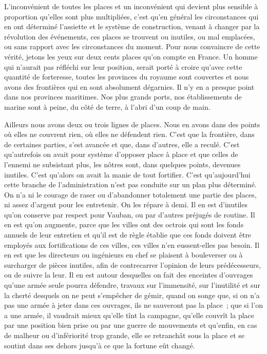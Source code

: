 \documentclass[french,twoside]{book} %
\begin{document}
L’inconvénient de toutes les places et un inconvénient qui devient plus sensible à proportion qu’elles sont plus multipliées, c’est qu’en général les circonstances qui en ont déterminé l’assiette et le système de construction, venant à changer par la révolution des événements, ces places se trouvent ou inutiles, ou mal emplacées, ou sans rapport avec les circonstances du moment. Pour nous convaincre de cette vérité, jetons les yeux sur deux cents places qu’on compte en France. Un homme qui n’aurait pas réfléchi sur leur position, serait porté à croire qu’avec cette quantité de forteresse, toutes les provinces du royaume sont couvertes et nous avons des frontières qui en sont absolument dégarnies. Il n’y en a presque point dans nos provinces maritimes. Nos plus grands ports, nos établissements de marine sont à peine, du côté de terre, à l’abri d’un coup de main.\par
Ailleurs nous avons deux ou trois lignes de places. Nous en avons dans des points où elles ne couvrent rien, où elles ne défendent rien. C’est que la frontière, dans de certaines parties, s’est avancée et que, dans d’autres, elle a reculé. C’est qu’autrefois on avait pour système d’opposer place à place et que celles de l’ennemi ne subsistant plus, les nôtres sont, dans quelques points, devenues inutiles. C’est qu’alors on avait la manie de tout fortifier. C’est qu’aujourd’hui cette branche de l’administration n’est pas conduite sur un plan plus déterminé. On n’a ni le courage de raser ou d’abandonner totalement une partie des places, ni assez d’argent pour les entretenir. On les répare à demi. Il en est d’inutiles qu’on conserve par respect pour Vauban, ou par d’autres préjugés de routine. Il en est qu’on augmente, parce que les villes ont des octrois qui sont les fonds annuels de leur entretien et qu’il est de règle établie que ces fonds doivent être employés aux fortifications de ces villes, ces villes n’en eussent-elles pas besoin. Il en est que les directeurs ou ingénieurs en chef se plaisent à bouleverser ou à surcharger de pièces inutiles, afin de contrecarrer l’opinion de leurs prédécesseurs, ou de suivre la leur. Il en est autour desquelles on fait des enceintes d’ouvrages qu’une armée seule pourra défendre, travaux sur l’immensité, sur l’inutilité et sur la cherté desquels on ne peut s’empêcher de gémir, quand on songe que, si on n’a pas une armée à jeter dans ces ouvrages, ils ne sauveront pas la place ; que si l’on a une armée, il vaudrait mieux qu’elle tînt la campagne, qu’elle couvrît la place par une position bien prise ou par une guerre de mouvements et qu’enfin, en cas de malheur ou d’infériorité trop grande, elle se retranchât sous la place et se soutint dans ses dehors jusqu’à ce que la fortune eût changé.\par
\end{document}
